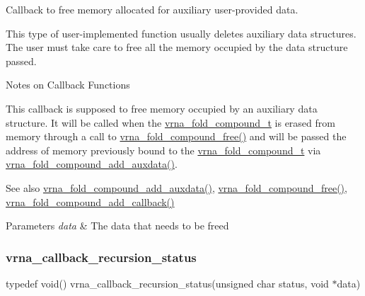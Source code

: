 Callback to free memory allocated for auxiliary user-\/provided data. 

This type of user-\/implemented function usually deletes auxiliary data structures. The user must take care to free all the memory occupied by the data structure passed.

\begin{DoxyRefDesc}{Notes on Callback Functions}
\item[\mbox{\hyperlink{callbacks__callbacks000005}{Notes on Callback Functions}}]This callback is supposed to free memory occupied by an auxiliary data structure. It will be called when the \mbox{\hyperlink{group__fold__compound_ga1b0cef17fd40466cef5968eaeeff6166}{vrna\+\_\+fold\+\_\+compound\+\_\+t}} is erased from memory through a call to \mbox{\hyperlink{group__fold__compound_gadded6039d63f5d6509836e20321534ad}{vrna\+\_\+fold\+\_\+compound\+\_\+free()}} and will be passed the address of memory previously bound to the \mbox{\hyperlink{group__fold__compound_ga1b0cef17fd40466cef5968eaeeff6166}{vrna\+\_\+fold\+\_\+compound\+\_\+t}} via \mbox{\hyperlink{group__fold__compound_ga6316a9426bea2f742375e8df6febd3f6}{vrna\+\_\+fold\+\_\+compound\+\_\+add\+\_\+auxdata()}}. \end{DoxyRefDesc}


\begin{DoxySeeAlso}{See also}
\mbox{\hyperlink{group__fold__compound_ga6316a9426bea2f742375e8df6febd3f6}{vrna\+\_\+fold\+\_\+compound\+\_\+add\+\_\+auxdata()}}, \mbox{\hyperlink{group__fold__compound_gadded6039d63f5d6509836e20321534ad}{vrna\+\_\+fold\+\_\+compound\+\_\+free()}}, \mbox{\hyperlink{group__fold__compound_ga097ed6133055624667cbce8cfdebf82d}{vrna\+\_\+fold\+\_\+compound\+\_\+add\+\_\+callback()}}
\end{DoxySeeAlso}

\begin{DoxyParams}{Parameters}
{\em data} & The data that needs to be free\textquotesingle{}d \\
\hline
\end{DoxyParams}
\mbox{\label{group__fold__compound_gac86036fa8cad1108832335063243cdc8}} 
\subsubsection{\texorpdfstring{vrna\+\_\+callback\+\_\+recursion\+\_\+status}{vrna\_callback\_recursion\_status}}
{\footnotesize\ttfamily typedef void() vrna\+\_\+callback\+\_\+recursion\+\_\+status(unsigned char status, void $\ast$data)}



